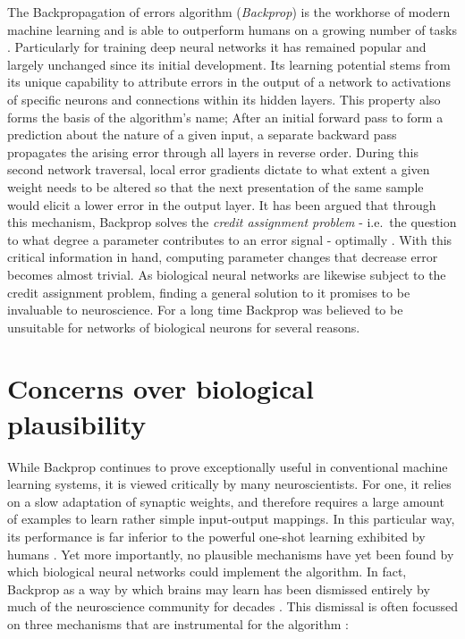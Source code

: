 The Backpropagation of errors algorithm (\textit{Backprop}) \citep{Schmidhuber2014} is the workhorse of modern machine
learning and is able to outperform humans on a growing number of tasks \citep{LeCun2015}. Particularly for training deep
neural networks it has remained popular and largely unchanged since its initial development. Its learning potential
stems from its unique capability to attribute errors in the output of a network to activations of specific neurons and
connections within its hidden layers. This property also forms the basis of the algorithm's name; After an initial
forward pass to form a prediction about the nature of a given input, a separate backward pass propagates the arising
error through all layers in reverse order. During this second network traversal, local error gradients dictate to what
extent a given weight needs to be altered so that the next presentation of the same sample would elicit a lower error in
the output layer. It has been argued that through this mechanism, Backprop solves the \textit{credit assignment problem}
- i.e.\ the question to what degree a parameter contributes to an error signal - optimally \citep{Lillicrap2020}. With
this critical information in hand, computing parameter changes that decrease error becomes almost trivial. As biological
neural networks are likewise subject to the credit assignment problem, finding a general solution to it promises to be
invaluable to neuroscience. For a long time Backprop was believed to be unsuitable for networks of biological neurons
for several reasons.


\section{Concerns over biological plausibility}

While Backprop continues to prove exceptionally useful in conventional machine learning systems, it is viewed critically
by many neuroscientists. For one, it relies on a slow adaptation of synaptic weights, and therefore requires a large
amount of examples to learn rather simple input-output mappings. In this particular way, its performance is far inferior
to the powerful one-shot learning exhibited by humans \citep{Brea2016}. Yet more importantly, no plausible mechanisms
have yet been found by which biological neural networks could implement the algorithm. In fact, Backprop as a way by
which brains may learn has been dismissed entirely by much of the neuroscience community for decades
\citep{Grossberg1987,Crick1989,Mazzoni1991,OReilly1996}. This dismissal is often focussed on three mechanisms that are
instrumental for the algorithm \citep{whittington2019theories,Bengio2015,Liao2016}:



